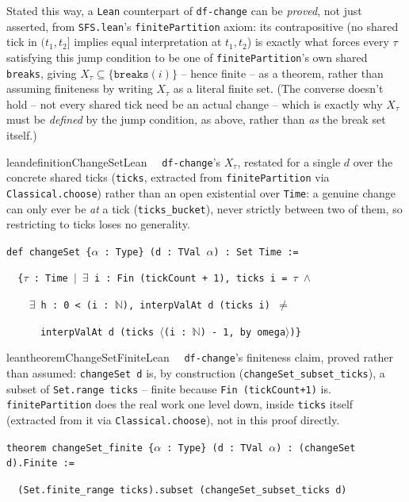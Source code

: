 \pn Stated this way, a \texttt{Lean}
counterpart of \texttt{df-change} can be \emph{proved}, not just asserted, from \texttt{SFS.lean}'s
\texttt{finitePartition} axiom: its contrapositive (no shared tick in $(t_1,t_2]$ implies equal
interpretation at $t_1,t_2$) is exactly what forces every $\tau$ satisfying this jump condition to be one
of \texttt{finitePartition}'s own shared \texttt{breaks}, giving $X_\tau\subseteq\{\texttt{breaks}(i)\}$
-- hence finite -- as a theorem, rather than assuming finiteness by writing $X_\tau$ as a literal finite
set. (The converse doesn't hold -- not every shared tick need be an actual change -- which is exactly why
$X_\tau$ must be \emph{defined} by the jump condition, as above, rather than \emph{as} the break set
itself.)

\begin{restatable}{leandefinition}{ChangeSetLean}~~ \texttt{df-change}'s $X_\tau$,
restated for a single $d$ over the concrete shared ticks (\texttt{ticks}, extracted from
\texttt{finitePartition} via \texttt{Classical.choose}) rather than an open existential over
\texttt{Time}: a genuine change can only ever be \emph{at} a tick (\texttt{ticks\_bucket}), never
strictly between two of them, so restricting to ticks loses no generality.

\texttt{\textcolor{leancolor}{def} \textcolor{leanyellow}{changeSet} \{$\alpha$ : Type\} (d : TVal $\alpha$) : Set Time :=}

\texttt{~~\{$\tau$ : Time $\vert$ $\exists$ i : Fin (tickCount + 1), ticks i = $\tau$ $\wedge$}

\texttt{~~~~$\exists$ h : 0 < (i : $\mathbb{N}$), interpValAt d (ticks i) $\neq$}

\texttt{~~~~~~interpValAt d (ticks $\langle$(i : $\mathbb{N}$) - 1, by omega$\rangle$)\}}
\label{changeSet}
\end{restatable}

\begin{restatable}{leantheorem}{ChangeSetFiniteLean}~~ \texttt{df-change}'s
finiteness claim, proved rather than assumed: \texttt{changeSet d} is, by construction
(\texttt{changeSet\_subset\_ticks}), a subset of \texttt{Set.range ticks} -- finite because
\texttt{Fin (tickCount+1)} is. \texttt{finitePartition} does the real work one level down, inside
\texttt{ticks} itself (extracted from it via \texttt{Classical.choose}), not in this proof directly.

\texttt{\textcolor{leancolor}{theorem} \textcolor{leanyellow}{changeSet\_finite} \{$\alpha$ : Type\} (d : TVal $\alpha$) : (changeSet d).Finite :=}

\texttt{~~(Set.finite\_range ticks).subset (changeSet\_subset\_ticks d)}
\label{changeSet_finite}
\end{restatable}

